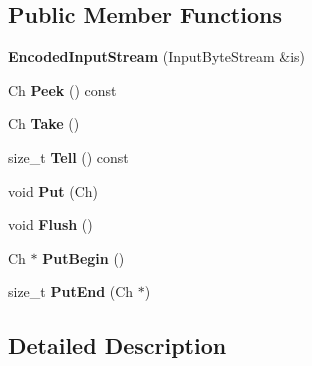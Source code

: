 \subsection*{Public Member Functions}
\begin{DoxyCompactItemize}
\item 
{\bfseries Encoded\+Input\+Stream} (Input\+Byte\+Stream \&is)\hypertarget{classEncodedInputStream_a17f8e629500f6ae71cb72d1d63bf41fd}{}\label{classEncodedInputStream_a17f8e629500f6ae71cb72d1d63bf41fd}

\item 
Ch {\bfseries Peek} () const \hypertarget{classEncodedInputStream_abda3b0c141254343f4c481f67d52b423}{}\label{classEncodedInputStream_abda3b0c141254343f4c481f67d52b423}

\item 
Ch {\bfseries Take} ()\hypertarget{classEncodedInputStream_ab42cd57581bf62e42af471583e5b8377}{}\label{classEncodedInputStream_ab42cd57581bf62e42af471583e5b8377}

\item 
size\+\_\+t {\bfseries Tell} () const \hypertarget{classEncodedInputStream_a34cdb99fd81cd211f71903348e9c986f}{}\label{classEncodedInputStream_a34cdb99fd81cd211f71903348e9c986f}

\item 
void {\bfseries Put} (Ch)\hypertarget{classEncodedInputStream_afea36b666a44bd4adeabfcab7b68a322}{}\label{classEncodedInputStream_afea36b666a44bd4adeabfcab7b68a322}

\item 
void {\bfseries Flush} ()\hypertarget{classEncodedInputStream_aa4415bf4b97dd01e8c3de0ad7a161724}{}\label{classEncodedInputStream_aa4415bf4b97dd01e8c3de0ad7a161724}

\item 
Ch $\ast$ {\bfseries Put\+Begin} ()\hypertarget{classEncodedInputStream_ad97f7a549a8622c61b7fb2c63fedd69b}{}\label{classEncodedInputStream_ad97f7a549a8622c61b7fb2c63fedd69b}

\item 
size\+\_\+t {\bfseries Put\+End} (Ch $\ast$)\hypertarget{classEncodedInputStream_a83fe5ed281413d6005d1b324730e8bed}{}\label{classEncodedInputStream_a83fe5ed281413d6005d1b324730e8bed}

\end{DoxyCompactItemize}


\subsection{Detailed Description}
